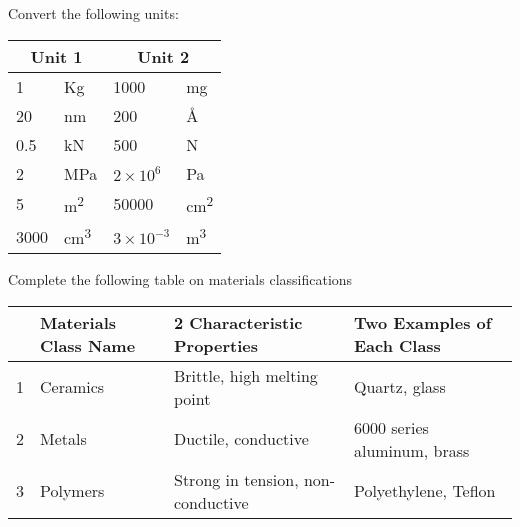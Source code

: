 \documentclass[answers]{exam}
\begin{document}
   \begin{questions} 

    \let\oldsolution\solution
    \renewcommand{\solution}{\color{pinkishpurpledark}\oldsolution}

    \question[3] Convert the following units:
    \begin{table}[h]
    \centering
    \renewcommand{\arraystretch}{1.5} %
    \begin{tabularx}{\textwidth}{|X|X|X|X|}
        \hline
        \multicolumn{2}{|c|}{\textbf{Unit 1}} & \multicolumn{2}{c|}{\textbf{Unit 2}} \\ \hline
        1 & Kg & \textcolor{pinkishpurpledark}{1000} & mg \\ \hline
        20 & nm & \textcolor{pinkishpurpledark}{200} & \r{A} \\ \hline
        0.5 & kN & \textcolor{pinkishpurpledark}{500} & N \\ \hline
        2 & MPa & \textcolor{pinkishpurpledark}{$2\times 10^6$} & Pa \\ \hline
        5 & m\textsuperscript{2} & \textcolor{pinkishpurpledark}{50000}  & cm\textsuperscript{2} \\ \hline
        3000 & cm\textsuperscript{3} & \textcolor{pinkishpurpledark}{$3 \times 10^{-3}$} & m\textsuperscript{3} \\ \hline
    \end{tabularx}
\end{table}

\question[3] Complete the following table on materials classifications

\begin{table}[h]
    \centering
    \renewcommand{\arraystretch}{1.5} %
    \begin{tabularx}{\textwidth}{|c|X|X|X|}
        \hline
         & \textbf{Materials Class Name} & \textbf{2 Characteristic Properties} & \textbf{Two Examples of Each Class} \\ \hline
        1 & \textcolor{pinkishpurpledark}{Ceramics} & \textcolor{pinkishpurpledark}{Brittle, high melting point}  &  \textcolor{pinkishpurpledark}{Quartz, glass} \\ \hline
        2 & \textcolor{pinkishpurpledark}{Metals} & \textcolor{pinkishpurpledark}{Ductile, conductive} &  \textcolor{pinkishpurpledark}{6000 series aluminum, brass} \\ \hline
        3 & \textcolor{pinkishpurpledark}{Polymers} & \textcolor{pinkishpurpledark}{Strong in tension, non-conductive}  &  \textcolor{pinkishpurpledark}{Polyethylene, Teflon} \\ \hline
    \end{tabularx}
\end{table}


\end{questions}
\end{document}
